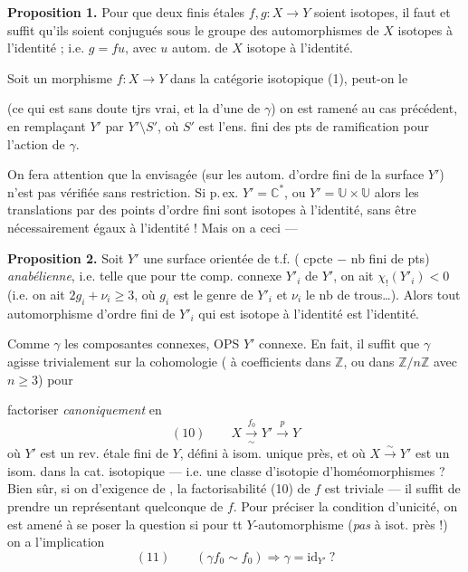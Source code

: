 \documentclass[11pt,a4paper]{article}
\begin{document}
\textbf{Proposition 1.} Pour que deux   finis étales $f,g\colon X\to Y$ soient isotopes, il faut et suffit qu'ils soient conjugués sous le groupe des automorphismes de $X$ isotopes à l'identité ; i.e. $g=fu$, avec $u$ autom. de $X$ isotope à l'identité.

Soit un  morphisme $f\colon X\to Y$ dans la catégorie isotopique (1), peut-on le


(ce qui est sans doute tjrs vrai, et  la  d'une  de $\gamma$) on est ramené au cas précédent, en  remplaçant $Y'$ par $Y'\setminus S'$, où $S'$ est l'ens. fini des pts de ramification pour l'action de $\gamma$.

On fera attention que la   envisagée  (sur les autom. d'ordre fini de la surface $Y'$) n'est pas vérifiée sans restriction. Si p.\,ex. $Y'=\mathbb{C}^{*}$, ou $Y'=\mathbb{U}\times\mathbb{U}$
alors les translations par des points d'ordre fini sont isotopes à l'identité, sans être nécessairement égaux à l'identité ! Mais on a ceci —

\textbf{Proposition 2.} Soit $Y'$ une surface orientée de t.f. ( cpcte $-$ nb fini de pts) \emph{anabélienne}, i.e. telle que pour tte comp. connexe $Y'_{i}$ de $Y'$, on ait $\chi_{!}(Y'_{i})<0$ (i.e. on ait $2g_{i}+\nu_{i}\geq 3$, où $g_{i}$ est le genre de $Y'_{i}$ et $\nu_{i}$ le nb de trous…). Alors tout automorphisme \add{$\gamma$} d'ordre fini de $Y'_{i}$ qui est isotope à l'identité est l'identité.

Comme $\gamma$  les composantes connexes, OPS $Y'$ connexe. En fait, il suffit que $\gamma$ agisse trivialement sur la cohomologie  ( à coefficients dans $\mathbb{Z}$, ou dans  $\mathbb{Z}/n\mathbb{Z}$ avec $n\geq 3$) pour


factoriser \emph{canoniquement} en
\[
  (10)\qquad X\xrightarrow[\ \sim\ ]{\ f_{0}\ }Y'\xrightarrow{\ p\ }Y
\]
où $Y'$ est un rev. étale fini de $Y$, défini à isom. unique près, et où $X\xrightarrow{\sim}Y'$ est un isom. dans la cat. isotopique — i.e. une classe d'isotopie d'homéomorphismes ? Bien sûr, si on  \ill{} d'exigence de , la factorisabilité (10) de $f$ est triviale — il suffit de prendre un représentant quelconque de $f$.  Pour préciser la  condition d'unicité, on est amené à se poser la question si pour tt $Y$-automorphisme  (\emph{pas} à isot. près !)  on a l'implication
\[
  (11)\qquad (\gamma f_{0}\sim f_{0})\Longrightarrow\gamma=\mathrm{id}_{Y'}\ ?
\]
\end{document}
